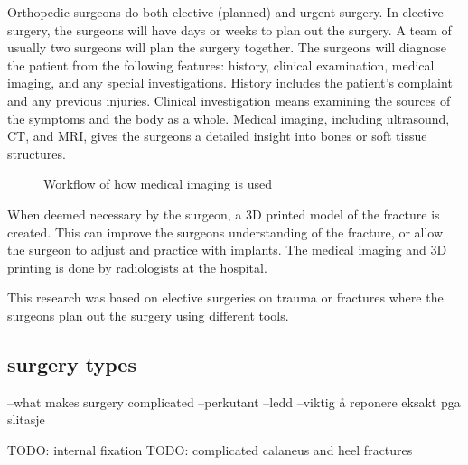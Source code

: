 \documentclass[a4paper]{report}
\begin{document}
Orthopedic surgeons do both elective (planned) and urgent surgery. In elective surgery, the surgeons will have days or weeks to plan out the surgery. A team of usually two surgeons will plan the surgery together.
The surgeons will diagnose the patient from the following features: history, clinical examination, medical imaging, and any special investigations. History includes the patient's complaint and any previous injuries. Clinical investigation means examining the sources of the symptoms and the body as a whole. Medical imaging, including ultrasound, CT, and MRI, gives the surgeons a detailed insight into bones or soft tissue structures\cite{swiontkowski_manual_2013}.

\begin{figure}[h!]
    \centering
	\hfill
  \caption{Workflow of how medical imaging is used}
  \small
\end{figure}

When deemed necessary by the surgeon, a 3D printed model of the fracture is created. This can improve the surgeons understanding of the fracture, or allow the surgeon to adjust and practice with implants. The medical imaging and 3D printing is done by radiologists at the hospital.

This research was based on elective surgeries on trauma or fractures where the surgeons plan out the surgery using different tools.

\subsection{surgery types}
--what makes surgery complicated
--perkutant
--ledd
--viktig å reponere eksakt pga slitasje

TODO: internal fixation
TODO: complicated calaneus and heel fractures
\end{document}
